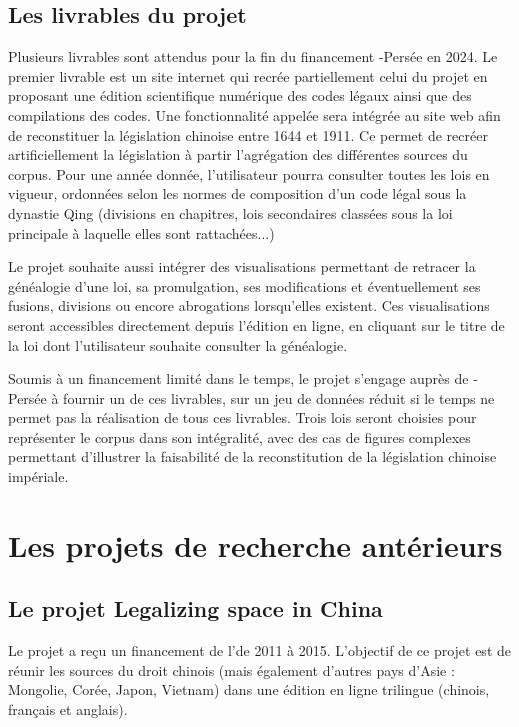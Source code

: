 \subsection{Les livrables du projet}
Plusieurs livrables sont attendus pour la fin du financement \CollEx-Persée en 2024. Le premier livrable est un site internet qui recrée partiellement celui du projet \LSC en proposant une édition scientifique numérique des codes légaux ainsi que des compilations des codes.
Une fonctionnalité appelée \code sera intégrée au site web afin de reconstituer la législation chinoise entre 1644 et 1911. Ce \code permet de recréer artificiellement la législation à partir l'agrégation des différentes sources du corpus. Pour une année donnée, l'utilisateur pourra consulter toutes les lois en vigueur, ordonnées selon les normes de composition d'un code légal sous la dynastie Qing (divisions en chapitres, lois secondaires classées sous la loi principale à laquelle elles sont rattachées...)

Le projet souhaite aussi intégrer des visualisations permettant de retracer la généalogie d'une loi, sa promulgation, ses modifications et éventuellement ses fusions, divisions ou encore abrogations lorsqu'elles existent. Ces visualisations seront accessibles directement depuis l'édition en ligne, en cliquant sur le titre de la loi dont l'utilisateur souhaite consulter la généalogie. 

Soumis à un financement limité dans le temps, le projet \COREL s'engage auprès de \CollEx-Persée à fournir un \POC de ces livrables, sur un jeu de données réduit si le temps ne permet pas la réalisation de tous ces livrables. Trois lois seront choisies pour représenter le corpus dans son intégralité, avec des cas de figures complexes permettant d'illustrer la faisabilité de la reconstitution de la législation chinoise impériale.


\section{Les projets de recherche antérieurs}
    \subsection{Le projet Legalizing space in China}

Le projet \LSC a reçu un financement de l'\ANR de 2011 à 2015. L'objectif de ce projet est de réunir les sources du droit chinois (mais également d'autres pays d'Asie : Mongolie, Corée, Japon, Vietnam) dans une édition en ligne trilingue (chinois, français et anglais). 


